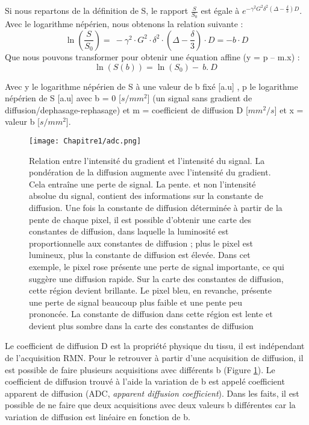 Si nous repartons de la définition de S, le rapport $\frac{S}{S_0}$ est égale à $e^{-\gamma ^2 G^2 \delta ^2 (\Delta-\frac{\delta}{3})D}$. Avec le logarithme népérien, nous obtenons la relation suivante :
\begin{equation}
\nonumber
\ln{\left(\frac{S}{S_0}\right)}=\ -\gamma^2 \cdot G^2 \cdot\delta ^2 \cdot (\Delta-\frac{\delta}{3}) \cdot D = -b \cdot D
\end{equation}
Que nous pouvons transformer pour obtenir une équation affine (y = p – m.x) :
\begin{equation}
\nonumber
\ln{\left(S\left(b\right)\right)=}\ln{\left(S_0\right)}-\ b.\ D\ 
\end{equation}

Avec y le logarithme népérien de S à une valeur de b fixé [a.u] , p le logarithme népérien de S [a.u]  avec b = 0 [$s/mm^2$] (un signal sans gradient de diffusion/dephasage-rephasage) et  m  = coefficient de diffusion D [$mm^2/s$] et x = valeur b [$s/mm^2$].\\

\begin{figure}[!htbp]
  \begin{center}
    \texttt{[image: Chapitre1/adc.png]}
     \end{center}
    \caption{Relation entre l'intensité du gradient et l'intensité du signal. La pondération de la diffusion augmente avec l'intensité du gradient. Cela entraîne une perte de signal. La pente. et non l'intensité absolue du signal, contient des informations sur la constante de diffusion. Une fois la constante de diffusion déterminée à partir de la pente de chaque pixel, il est possible d'obtenir une carte des constantes de diffusion, dans laquelle la luminosité est proportionnelle aux constantes de diffusion ; plus le pixel est lumineux, plus la constante de diffusion est élevée. Dans cet exemple, le pixel rose présente une perte de signal importante, ce qui suggère une diffusion rapide. Sur la carte des constantes de diffusion, cette région devient brillante. Le pixel bleu, en revanche, présente une perte de signal beaucoup plus faible et une pente peu prononcée. La constante de diffusion dans cette région est lente et devient plus sombre dans la carte des constantes de diffusion}
  \label{fig:adc}
\end{figure}

Le coefficient de diffusion D est la propriété physique du tissu, il est indépendant de l’acquisition RMN. Pour le retrouver à partir d’une acquisition de diffusion, il est possible de faire plusieurs acquisitions avec différents b (Figure \ref{fig:adc}). Le coefficient de diffusion trouvé à l’aide la variation de b est appelé coefficient apparent de diffusion (ADC, \textit{apparent diffusion coefficient}). Dans les faits, il est possible de ne faire que deux acquisitions avec deux valeurs b différentes car la variation de diffusion est linéaire en fonction de b.
\clearpage
